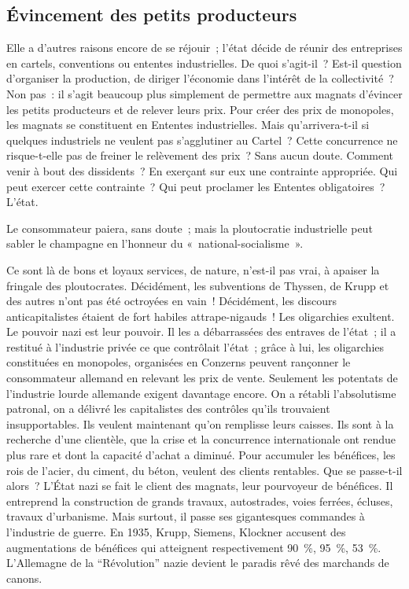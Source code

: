 \documentclass[french,twoside]{book} %
\begin{document}
\subsection[Évincement des petits producteurs]{Évincement des petits producteurs}
\noindent Elle a d’autres raisons encore de se réjouir ; l’état décide de réunir des entreprises en cartels, conventions ou ententes industrielles. De quoi s’agit-il ? Est-il question d’organiser la production, de diriger l’économie dans l’intérêt de la collectivité ? Non pas : il s’agit beaucoup plus simplement de permettre aux magnats d’évincer les petits producteurs et de relever leurs prix. Pour créer des prix de monopoles, les magnats se constituent en Ententes industrielles. Mais qu’arrivera-t-il si quelques industriels ne veulent pas s’agglutiner au Cartel ? Cette concurrence ne risque-t-elle pas de freiner le relèvement des prix ? Sans aucun doute. Comment venir à bout des dissidents ? En exerçant sur eux une contrainte appropriée. Qui peut exercer cette contrainte ? Qui peut proclamer les Ententes obligatoires ? L’état.\par
Le consommateur paiera, sans doute ; mais la ploutocratie industrielle peut sabler le champagne en l’honneur du « national-socialisme ».\par
Ce sont là de bons et loyaux services, de nature, n’est-il pas vrai, à apaiser la fringale des ploutocrates. Décidément, les subventions de Thyssen, de Krupp et des autres n’ont pas été octroyées en vain ! Décidément, les discours anticapitalistes étaient de fort habiles attrape-nigauds ! Les oligarchies exultent. Le pouvoir nazi est leur pouvoir. Il les a débarrassées des entraves de l’état ; il a restitué à l’industrie privée ce que contrôlait l’état ; grâce à lui, les oligarchies constituées en monopoles, organisées en Conzerns peuvent rançonner le consommateur allemand en relevant les prix de vente. Seulement les potentats de l’industrie lourde allemande exigent davantage encore. On a rétabli l’absolutisme patronal, on a délivré les capitalistes des contrôles qu’ils trouvaient insupportables. Ils veulent maintenant qu’on remplisse leurs caisses. Ils sont à la recherche d’une clientèle, que la crise et la concurrence internationale ont rendue plus rare et dont la capacité d’achat a diminué. Pour accumuler les bénéfices, les rois de l’acier, du ciment, du béton, veulent des clients rentables. Que se passe-t-il alors ? L’État nazi se fait le client des magnats, leur pourvoyeur de bénéfices. Il entreprend la construction de grands travaux, autostrades, voies ferrées, écluses, travaux d’urbanisme. Mais surtout, il passe ses gigantesques commandes à l’industrie de guerre. En 1935, Krupp, Siemens, Klockner accusent des augmentations de bénéfices qui atteignent respectivement 90 \%, 95 \%, 53 \%. L’Allemagne de la “Révolution” nazie devient le paradis rêvé des marchands de canons.
\end{document}

